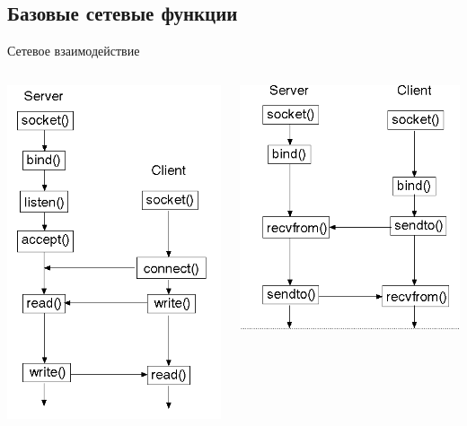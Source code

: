 \subsection{Базовые сетевые функции}
\begin{frame}{Сетевое взаимодействие}
	\begin{columns}
	\begin{center}
		\includegraphics[height=0.8\textheight]{05-tcp_seq.png}
	\end{center}
	\begin{center}
		\includegraphics[height=0.6\textheight]{05-udp_seq.png}
	\end{center}


\end{columns}
\end{frame}
